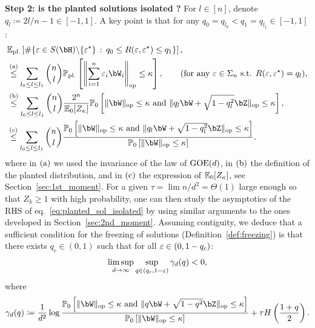 \myskip
\textbf{Step 2: is the planted solutions isolated ?}
For $l \in [n]$, denote $q_l \coloneqq 2l/n - 1 \in [-1,1]$.
A key point is that for any $q_0 = q_{l_0} < q_1 = q_{l_1} \in [-1,1]$:
\begin{align}\label{eq:planted_sol_isolated}
    \nonumber
    &\EE_\pl \left[\# \{\eps \in S(\bH) \backslash \{\eps^\star\} \, : \, q_0 \leq R(\eps, \eps^\star) \leq q_1\}\right], \\ 
    \nonumber
    &\aleq \sum_{l_0 \leq l \leq l_1} \binom{n}{l} \bbP_{\pl} \left[\left\|\sum_{i=1}^n \eps_i \bW_i\right\|_\op \leq \kappa\right], \hspace{20pt} (\textrm{for any } \eps \in \Sigma_n \textrm{ s.t. } R(\eps, \eps^\star) = q_l), \\
    \nonumber
    &\bleq \sum_{l_0 \leq l \leq l_1}\binom{n}{l} \frac{2^n}{\EE_0[Z_\kappa]} \bbP_{0} \left[\|\bW\|_\op \leq \kappa \textrm{ and } \|q_l \bW + \sqrt{1-q_l^2} \bZ\|_\op \leq \kappa\right], \\
    &\cleq \sum_{l_0 \leq l \leq l_1}\binom{n}{l} \frac{\bbP_{0} \left[\|\bW\|_\op \leq \kappa \textrm{ and } \|q_l \bW + \sqrt{1-q_l^2} \bZ\|_\op \leq \kappa\right]}{\bbP_{0} \left[\|\bW\|_\op \leq \kappa\right]}.
\end{align}
where 
in $(\rm a)$ we used the invariance of the law of $\mathrm{GOE}(d)$, in $(\rm b)$ the definition of the planted distribution, and in $(\rm c)$ the expression of $\mathbb{E}_0[Z_\kappa]$, see Section~\ref{sec:1st_moment}.
For a given $\tau = \lim n / d^2 = \Theta(1)$ large enough so that $Z_k \geq 1$ with high probability,
one can then 
study the asymptotics of the RHS of eq.~\eqref{eq:planted_sol_isolated}
by using
similar arguments to the ones developed in Section~\ref{sec:2nd_moment}.
Assuming contiguity, 
we deduce that a sufficient condition for the freezing of solutions 
(Definition~\ref{def:freezing})
is that there exists $q_c \in (0,1)$ such that for all $\varepsilon \in (0, 1- q_c)$:
\begin{align}\label{eq:sufficient_cond_freezing}
    \limsup_{d \to \infty} \sup_{q \in (q_c, 1-\varepsilon)} \gamma_d(q) < 0,
\end{align}
where
\begin{align}\label{eq:def_gammad}
   \gamma_d(q) \coloneqq \frac{1}{d^2} \log \frac{\bbP_0 \left[\|\bW\|_\op \leq \kappa \textrm{ and } \|q \bW + \sqrt{1-q^2} \bZ\|_\op \leq \kappa\right]}{\bbP_0 \left[\|\bW\|_\op \leq \kappa\right]} + \tau H\left(\frac{1+q}{2}\right).
\end{align}
